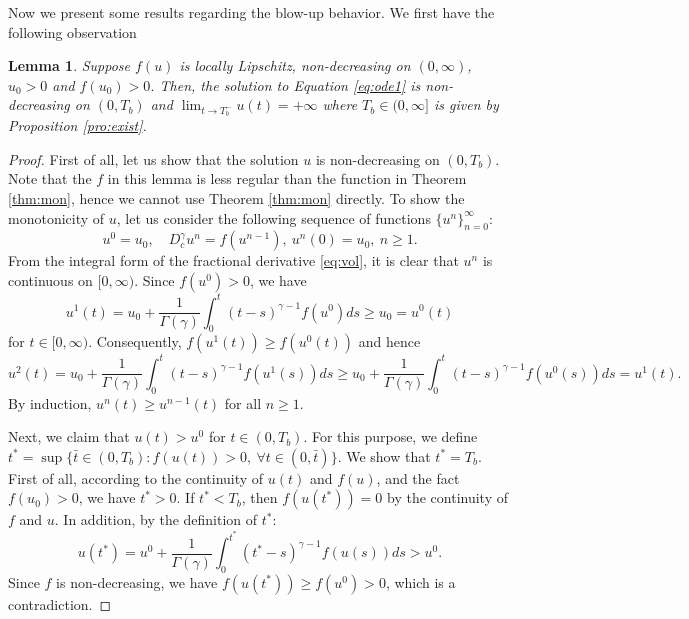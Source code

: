 \documentclass[12pt]{amsart}%
\newtheorem{lmm}[thm]{Lemma}
\theoremstyle{definition}
\theoremstyle{remark}
\renewcommand{\ge}{\geqslant}
\begin{document}
Now we present some results regarding the blow-up behavior. We first have the following observation
\begin{lmm}\label{lmm:toinfty}
Suppose $f(u)$ is locally Lipschitz, non-decreasing on $(0, \infty)$, $u_0>0$ and $f(u_0)>0$. Then, the solution to Equation \eqref{eq:ode1} is non-decreasing on $(0, T_b)$ and $\lim_{t\to T_b^-}u(t)=+\infty$ where $T_b\in (0, \infty]$ is given by Proposition \ref{pro:exist}.
\end{lmm}
\begin{proof}
First of all, let us show that the solution $u$ is non-decreasing on $(0, T_b)$. Note that the $f$ in this lemma is less regular than the function in Theorem \ref{thm:mon}, hence we cannot use Theorem \ref{thm:mon} directly. To show the monotonicity of $u$, let us consider the following sequence of functions $\{u^n\}_{n=0}^{\infty}$:
\[
u^0=u_0, \quad D_c^{\gamma}u^n=f(u^{n-1}),~u^n(0)=u_0,~n\ge 1.
\]
From the integral form of the fractional derivative \eqref{eq:vol}, it is clear that $u^n$ is continuous on $[0,\infty)$. Since $f(u^0)> 0$, we have 
\[
u^1(t)=u_0+\frac{1}{\Gamma(\gamma)}\int_0^t(t-s)^{\gamma-1}f(u^0)ds \ge u_0=u^0(t)
\]
 for $t\in [0,\infty)$. Consequently, $f(u^1(t))\ge f(u^0(t))$ and hence 
 \[
 u^2(t)=u_0+\frac{1}{\Gamma(\gamma)}\int_0^t(t-s)^{\gamma-1}f(u^1(s))ds\ge u_0+\frac{1}{\Gamma(\gamma)}\int_0^t(t-s)^{\gamma-1}f(u^0(s))ds=u^1(t).
 \]
By induction, $u^n(t)\ge u^{n-1}(t)$ for all $n\ge 1$. 

Next, we claim that $u(t)>u^0$ for $t\in (0, T_b)$. For this purpose, we define $t^*=\sup\{\bar{t}\in (0, T_b): f(u(t))>0,~ \forall t\in(0, \bar{t})\}$. We show that $t^*=T_b$. First of all, according to the continuity of $u(t)$ and $f(u)$, and the fact $f(u_0)>0$, we have $t^*>0$. If $t^*<T_b$, then $f(u(t^*))=0$ by the continuity of $f$ and $u$. In addition, by the definition of $t^*$: 
\[
u(t^*)=u^0+\frac{1}{\Gamma(\gamma)}\int_0^{t^*}(t^*-s)^{\gamma-1}f(u(s))ds>u^0.
\]
Since $f$ is non-decreasing, we have $f(u(t^*))\ge f(u^0)>0$, which is a contradiction.


\end{proof}
\end{document}
